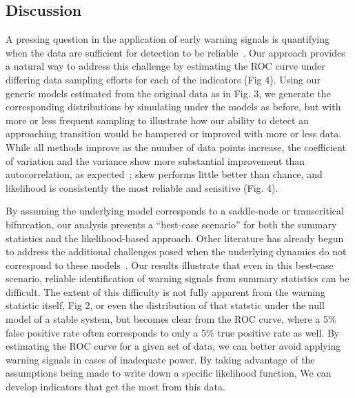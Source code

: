 \documentclass{pnastwo}
\begin{document}
\begin{article}

\section{Discussion}
A pressing question in the application of early warning signals is quantifying
when the data are sufficient for detection to be reliable~\cite{Scheffer2009, Scheffer2010, Inman2011}. 
Our approach provides a natural way to address this challenge by estimating the ROC curve under differing data sampling efforts
for each of the indicators (Fig 4). 
Using our generic models estimated from the original data as in Fig. 3, 
we generate the corresponding distributions by simulating under the models as before, 
but with more or less frequent sampling to illustrate how our ability to detect an approaching transition 
would be hampered or improved with more or less data.  
While all methods improve as the number of data points increase, 
the coefficient of variation and the variance show more substantial improvement than autocorrelation, 
as expected~\cite{Carpenter2011};⁠
skew performs little better than chance, and likelihood is consistently the most reliable and sensitive (Fig. 4). 


By assuming the underlying model corresponds to a saddle-node or transcritical bifurcation,
our analysis presents a ``best-case scenario'' for both the summary statistics and the likelihood-based approach. 
Other literature has already begun to address the additional challenges posed when the underlying 
dynamics do not correspond to these models~\cite{Hastings2010}.
Our results illustrate that even in this best-case scenario, 
reliable identification of warning signals from summary statistics can be difficult.  
The extent of this difficulty is not fully apparent from the warning statistic itself, Fig 2,
or even the distribution of that statstic under the null model of a stable system, 
but becomes clear from the ROC curve, where a 5\% false positive rate often corresponds to only a 5\% true positive rate as well.  
By estimating the ROC curve for a given set of data, 
we can better avoid applying warning signals in cases of inadequate power.
By taking advantage of the assumptions being made to write down a specific likelihood function,
We can develop indicators that get the most from this data.  



\end{article}
\end{document}
